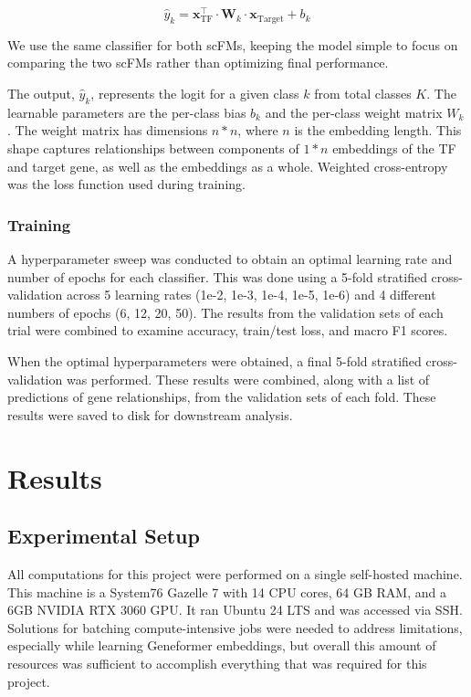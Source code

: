 \documentclass[12pt, letterpaper]{report}
\let\oldsection\section
\renewcommand{\section}{\clearpage\oldsection}
\begin{document}
\begin{equation}
    \hat{y}_k = \mathbf{x}_{\text{TF}}^\top \cdot \mathbf{W}_k \cdot \mathbf{x}_{\text{Target}} + b_k
    \label{eq:bilinear_model}
\end{equation}

We use the same classifier for both scFMs, keeping the model simple to focus on comparing the two scFMs rather than optimizing final performance.

The output, $\hat{y}_k$, represents the logit for a given class $k$ from total classes $K$. The learnable parameters are the per-class bias $b_k$ and the per-class weight matrix $W_k$. The weight matrix has dimensions $n * n$, where $n$ is the embedding length. This shape captures relationships between components of $1 * n$ embeddings of the TF and target gene, as well as the embeddings as a whole. Weighted cross-entropy was the loss function used during training.

\subsection{Training}

A hyperparameter sweep was conducted to obtain an optimal learning rate and number of epochs for each classifier. This was done using a 5-fold stratified cross-validation across 5 learning rates (1e-2, 1e-3, 1e-4, 1e-5, 1e-6) and 4 different numbers of epochs (6, 12, 20, 50). The results from the validation sets of each trial were combined to examine accuracy, train/test loss, and macro F1 scores.

When the optimal hyperparameters were obtained, a final 5-fold stratified cross-validation was performed. These results were combined, along with a list of predictions of gene relationships, from the validation sets of each fold. These results were saved to disk for downstream analysis.

\chapter{Results}
\label{ch:results}


\section{Experimental Setup}

All computations for this project were performed on a single self-hosted machine. This machine is a System76 Gazelle 7 with 14 CPU cores, 64 GB RAM, and a 6GB NVIDIA RTX 3060 GPU. It ran Ubuntu 24 LTS and was accessed via SSH. Solutions for batching compute-intensive jobs were needed to address limitations, especially while learning Geneformer embeddings, but overall this amount of resources was sufficient to accomplish everything that was required for this project. 
\end{document}
